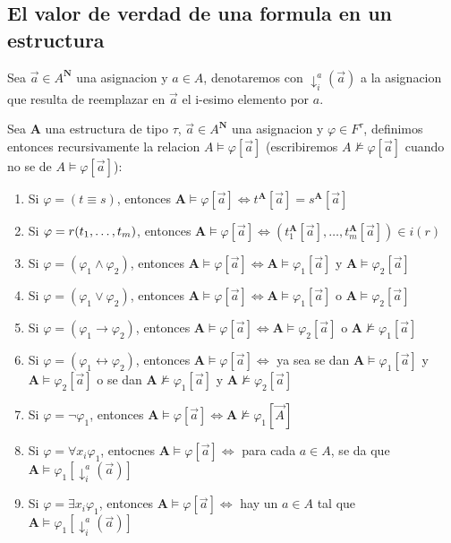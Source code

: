 \subsection{El valor de verdad de una formula en un estructura}
\begin{definition}
  Sea $\vec{a} \in A^\mathbf{N}$ una asignacion y $a \in A$, denotaremos con $\downarrow_i^a(\vec{a})$ a la asignacion
  que resulta de reemplazar en $\vec{a}$ el i-esimo elemento por $a$. 
\end{definition}
\begin{definition}
  Sea $\mathbf{A}$ una estructura de tipo $\tau$, $\vec{a} \in A^\mathbf{N}$ una asignacion y $\varphi \in F^\tau$, definimos entonces
  recursivamente la relacion $A \models \varphi[\vec{a}]$ (escribiremos $A \not\models \varphi[\vec{a}]$ cuando no se de $A \models \varphi[\vec{a}]$):
  \begin{enumerate}
    \item Si $\varphi = (t\equiv s)$, entonces $\mathbf{A} \models \varphi[\vec{a}] \iff t^\mathbf{A}[\vec{a}] = s^\mathbf{A}[\vec{a}]$
    \item Si $\varphi = r(t_{1}, \dots, t_{m})$, entonces $\mathbf{A} \models \varphi[\vec{a}] \iff (t_1^\mathbf{A}[\vec{a}], \dots, t_m^\mathbf{A}[\vec{a}]) \in i(r)$
    \item Si $\varphi = (\varphi_1 \land \varphi_2)$, entonces $\mathbf{A} \models \varphi[\vec{a}] \iff \mathbf{A}\models\varphi_1[\vec{a}]$ y $\mathbf{A}\models\varphi_2[\vec{a}]$ 
    \item Si $\varphi = (\varphi_1 \lor \varphi_2)$, entonces $\mathbf{A} \models \varphi[\vec{a}] \iff \mathbf{A}\models\varphi_1[\vec{a}]$ o $\mathbf{A}\models\varphi_2[\vec{a}]$ 
    \item Si $\varphi = (\varphi_1 \rightarrow \varphi_2)$, entonces $\mathbf{A}\models\varphi[\vec{a}] \iff \mathbf{A}\models\varphi_2[\vec{a}]$ o $\mathbf{A}\not\models\varphi_1[\vec{a}]$
    \item Si $\varphi = (\varphi_1 \leftrightarrow \varphi_2)$, entonces $\mathbf{A}\models\varphi[\vec{a}] \iff $ ya sea se dan $\mathbf{A}\models\varphi_1[\vec{a}]$ y $\mathbf{A}\models\varphi_2[\vec{a}]$ o se dan $\mathbf{A}\not\models\varphi_1[\vec{a}]$ y $\mathbf{A}\not\models\varphi_2[\vec{a}]$
    \item Si $\varphi = \neg\varphi_1$, entonces $\mathbf{A}\models\varphi[\vec{a}] \iff \mathbf{A}\not\models\varphi_1[\vec{A}]$
    \item Si $\varphi = \forall x_i \varphi_1$, entocnes $\mathbf{A}\models\varphi[\vec{a}] \iff $ para cada $a \in A$, se da que $\mathbf{A}\models\varphi_1[\downarrow_i^a(\vec{a})]$
    \item Si $\varphi = \exists x_i \varphi_1$, entonces $\mathbf{A}\models\varphi[\vec{a}] \iff $ hay un $a \in A$ tal que $\mathbf{A}\models\varphi_1[\downarrow_i^a(\vec{a})]$
  \end{enumerate}


\end{definition}
